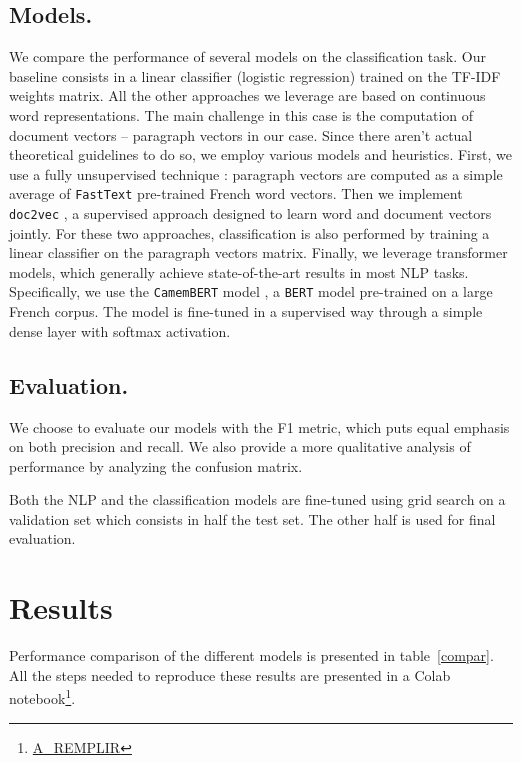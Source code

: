 \documentclass[11pt,a4paper]{article}
\begin{document}
\subsection{Models.} 

We compare the performance of several models on the classification task. Our baseline consists in a linear classifier (logistic regression) trained on the TF-IDF weights matrix. All the other approaches we leverage are based on continuous word representations. The main challenge in this case is the computation of document vectors -- paragraph vectors in our case. Since there aren't actual theoretical guidelines to do so, we employ various models and heuristics. First, we use a fully unsupervised technique : paragraph vectors are computed as a simple average of \verb|FastText| \cite{joulin2016bag} pre-trained French word vectors. Then we implement \verb|doc2vec| \cite{le2014distributed}, a supervised approach designed to learn word and document vectors jointly. For these two approaches, classification is also performed by training a linear classifier on the paragraph vectors matrix. Finally, we leverage transformer models, which generally achieve state-of-the-art results in most NLP tasks. Specifically, we use the \verb|CamemBERT| model \cite{martin2019camembert}, a \verb|BERT| model pre-trained on a large French corpus. The model is fine-tuned in a supervised way through a simple dense layer with softmax activation.

\subsection{Evaluation.}  

We choose to evaluate our models with the F1 metric, which puts equal emphasis on both precision and recall. We also provide a more qualitative analysis of performance by analyzing the confusion matrix. 

Both the NLP and the classification models are fine-tuned using grid search on a validation set which consists in half the test set. The other half is used for final evaluation.

\section{Results}

Performance comparison of the different models is presented in table~\ref{compar}. All the steps needed to reproduce these results are presented in a Colab notebook\footnote{\url{A_REMPLIR}}. 
\end{document}
